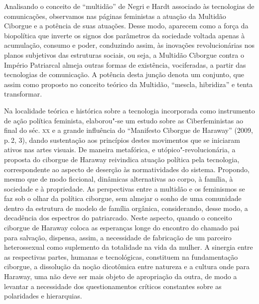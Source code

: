 Analisando o conceito de ``multidão'' de Negri e Hardt associado às
tecnologias de comunicações, observamos nas páginas feministas a atuação
da Multidão Ciborgue e a potência de suas atuações. Desse modo, aparecem
como a força da biopolítica que inverte os signos dos parâmetros da
sociedade voltada apenas à acumulação, consumo e poder, conduzindo
assim, às inovações revolucionárias nos planos subjetivos das estruturas
sociais, ou seja, a Multidão Ciborgue contra o Império Patriarcal almeja
outras formas de existência, vociferadas, a partir das tecnologias de
comunicação. A potência desta junção denota um conjunto, que assim como
proposto no conceito teórico da Multidão, ``mescla, hibridiza'' e tenta
transformar.

Na localidade teórica e histórica sobre a tecnologia incorporada como
instrumento de ação política feminista, elaborou"-se um estudo sobre as
Ciberfeministas ao final do séc. \textsc{xx} e a grande influência do ``Manifesto
Ciborgue de Haraway'' (2009, p.\,2, 3), dando sustentação aos princípios
destes movimentos que se iniciaram ativos nas artes visuais. De maneira
metafórica, e utópico"-revolucionária, a proposta do ciborgue de Haraway
reivindica atuação política pela tecnologia, correspondente ao aspecto
de deserção às normatividades do sistema. Propondo, mesmo que de modo
ficcional, dinâmicas alternativas ao corpo, à família, à sociedade e à
propriedade. As perspectivas entre a multidão e os feminismos se faz sob
o olhar da política ciborgue, sem almejar o sonho de uma comunidade
dentro da estrutura de modelo de família orgânica, considerando, desse
modo, a decadência dos espectros do patriarcado. Neste aspecto, quando o
conceito ciborgue de Haraway coloca as esperanças longe do encontro do
chamado pai para salvação, dispensa, assim, a necessidade de fabricação
de um parceiro heterossexual como suplemento da totalidade na vida da
mulher. A sinergia entre as respectivas partes, humanas e tecnológicas,
constituem na fundamentação ciborgue, a dissolução da noção dicotômica
entre natureza e a cultura onde para Haraway, uma não deve ser mais
objeto de apropriação da outra, de modo a levantar a necessidade dos
questionamentos críticos constantes sobre as polaridades e hierarquias.

